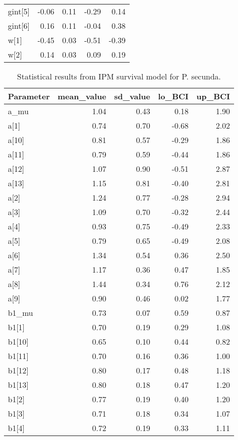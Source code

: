 \documentclass[12pt,]{article}
\begin{document}
\begin{table}[ht]
{\begin{tabular}{lrrrr}
  gint[5] & -0.06 & 0.11 & -0.29 & 0.14 \\ 
  gint[6] & 0.16 & 0.11 & -0.04 & 0.38 \\ 
  w[1] & -0.45 & 0.03 & -0.51 & -0.39 \\ 
  w[2] & 0.14 & 0.03 & 0.09 & 0.19 \\ 
   \hline
\end{tabular}
}
\end{table}\begin{table}[ht]
\centering
\caption{Statistical results from IPM survival model for P. secunda.} 
{\footnotesize
\begin{tabular}{lrrrr}
  \hline
Parameter & mean\_value & sd\_value & lo\_BCI & up\_BCI \\ 
  \hline
a\_mu & 1.04 & 0.43 & 0.18 & 1.90 \\ 
  a[1] & 0.74 & 0.70 & -0.68 & 2.02 \\ 
  a[10] & 0.81 & 0.57 & -0.29 & 1.86 \\ 
  a[11] & 0.79 & 0.59 & -0.44 & 1.86 \\ 
  a[12] & 1.07 & 0.90 & -0.51 & 2.87 \\ 
  a[13] & 1.15 & 0.81 & -0.40 & 2.81 \\ 
  a[2] & 1.24 & 0.77 & -0.28 & 2.94 \\ 
  a[3] & 1.09 & 0.70 & -0.32 & 2.44 \\ 
  a[4] & 0.93 & 0.75 & -0.49 & 2.33 \\ 
  a[5] & 0.79 & 0.65 & -0.49 & 2.08 \\ 
  a[6] & 1.34 & 0.54 & 0.36 & 2.50 \\ 
  a[7] & 1.17 & 0.36 & 0.47 & 1.85 \\ 
  a[8] & 1.44 & 0.34 & 0.76 & 2.12 \\ 
  a[9] & 0.90 & 0.46 & 0.02 & 1.77 \\ 
  b1\_mu & 0.73 & 0.07 & 0.59 & 0.87 \\ 
  b1[1] & 0.70 & 0.19 & 0.29 & 1.08 \\ 
  b1[10] & 0.65 & 0.10 & 0.44 & 0.82 \\ 
  b1[11] & 0.70 & 0.16 & 0.36 & 1.00 \\ 
  b1[12] & 0.80 & 0.17 & 0.48 & 1.18 \\ 
  b1[13] & 0.80 & 0.18 & 0.47 & 1.20 \\ 
  b1[2] & 0.77 & 0.19 & 0.40 & 1.20 \\ 
  b1[3] & 0.71 & 0.18 & 0.34 & 1.07 \\ 
  b1[4] & 0.72 & 0.19 & 0.33 & 1.11 \\ 

\end{tabular}}
\end{table}
\end{document}
